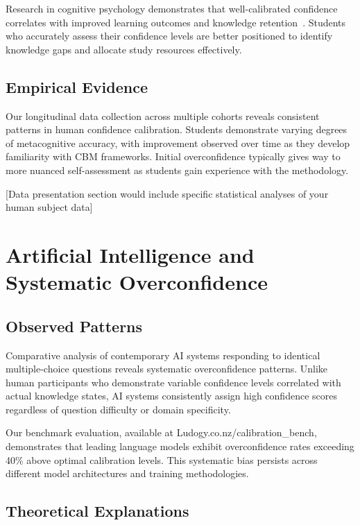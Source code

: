 \documentclass[sigconf]{acmart}
\begin{document}
Research in cognitive psychology demonstrates that well-calibrated confidence correlates with improved learning outcomes and knowledge retention~\cite{dunlosky2011four}. Students who accurately assess their confidence levels are better positioned to identify knowledge gaps and allocate study resources effectively.

\subsection{Empirical Evidence}

Our longitudinal data collection across multiple cohorts reveals consistent patterns in human confidence calibration. Students demonstrate varying degrees of metacognitive accuracy, with improvement observed over time as they develop familiarity with CBM frameworks. Initial overconfidence typically gives way to more nuanced self-assessment as students gain experience with the methodology.

[Data presentation section would include specific statistical analyses of your human subject data]

\section{Artificial Intelligence and Systematic Overconfidence}

\subsection{Observed Patterns}

Comparative analysis of contemporary AI systems responding to identical multiple-choice questions reveals systematic overconfidence patterns. Unlike human participants who demonstrate variable confidence levels correlated with actual knowledge states, AI systems consistently assign high confidence scores regardless of question difficulty or domain specificity.

Our benchmark evaluation, available at Ludogy.co.nz/calibration\_bench, demonstrates that leading language models exhibit overconfidence rates exceeding 40\% above optimal calibration levels. This systematic bias persists across different model architectures and training methodologies.

\subsection{Theoretical Explanations}
\end{document}
